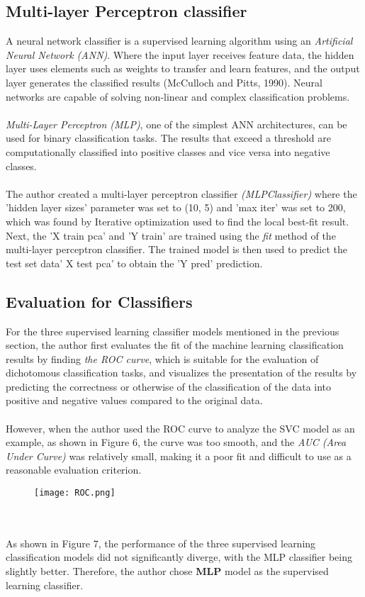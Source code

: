 \documentclass[10pt,twocolumn]{article}
\begin{document}
	\subsection{Multi-layer Perceptron classifier}
	A neural network classifier is a supervised learning algorithm using an \textit{Artificial Neural Network (ANN)}. Where the input layer receives feature data, the hidden layer uses elements such as weights to transfer and learn features, and the output layer generates the classified results (McCulloch and Pitts, 1990). Neural networks are capable of solving non-linear and complex classification problems.
	\\ \hspace*{\fill} \\
	\textit{Multi-Layer Perceptron (MLP)}, one of the simplest ANN architectures, can be used for binary classification tasks. The results that exceed a threshold are computationally classified into positive classes and vice versa into negative classes.
	\\ \hspace*{\fill} \\
	The author created a multi-layer perceptron classifier \textit{(MLPClassifier)} where the 'hidden layer sizes' parameter was set to (10, 5) and 'max iter' was set to 200, which was found by Iterative optimization used to find the local best-fit result. Next, the 'X train pca' and 'Y train' are trained using the \textit{fit} method of the multi-layer perceptron classifier. The trained model is then used to predict the test set data' X test pca' to obtain the 'Y pred' prediction.
	
	\subsection{Evaluation for Classifiers}
	For the three supervised learning classifier models mentioned in the previous section, the author first evaluates the fit of the machine learning classification results by finding \textit{the ROC curve}, which is suitable for the evaluation of dichotomous classification tasks, and visualizes the presentation of the results by predicting the correctness or otherwise of the classification of the data into positive and negative values compared to the original data.
	\\ \hspace*{\fill} \\
	However, when the author used the ROC curve to analyze the SVC model as an example, as shown in Figure 6, the curve was too smooth, and the \textit{AUC (Area Under Curve)} was relatively small, making it a poor fit and difficult to use as a reasonable evaluation criterion.
	\begin{figure}[h]
		\centering
		\texttt{[image: ROC.png]}
		\caption{}
	\end{figure}	
	\\ \hspace*{\fill} \\
	As shown in Figure 7, the performance of the three supervised learning classification models did not significantly diverge, with the MLP classifier being slightly better. Therefore, the author chose \textbf{MLP} model as the supervised learning classifier.
	
\end{document}
